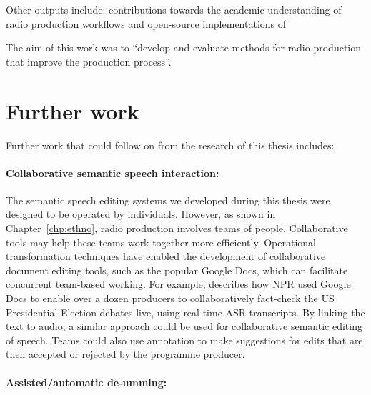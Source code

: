 Other outputs include: contributions towards the academic understanding of radio production workflows
and open-source implementations of



The aim of this work was to ``develop and evaluate methods for radio production that improve the production process''.





\section{Further work}

Further work that could follow on from the research of this thesis includes:

\paragraph{Collaborative semantic speech interaction:}

The semantic speech editing systems we developed during this thesis were designed to be operated by individuals.
However, as shown in Chapter~\ref{chp:ethno}, radio production involves teams of people.  Collaborative tools may help
these teams work together more efficiently.  Operational transformation techniques \citep{Sun2004} have enabled the
development of collaborative document editing tools, such as the popular Google Docs, which can facilitate concurrent
team-based working.  For example, \citet{Fisher2016} describes how NPR used Google Docs to enable over a dozen
producers to collaboratively fact-check the US Presidential Election debates live, using real-time ASR transcripts. By
linking the text to audio, a similar approach could be used for collaborative semantic editing of speech. Teams could
also use annotation to make suggestions for edits that are then accepted or rejected by the programme producer.

\paragraph{Assisted/automatic de-umming:}

